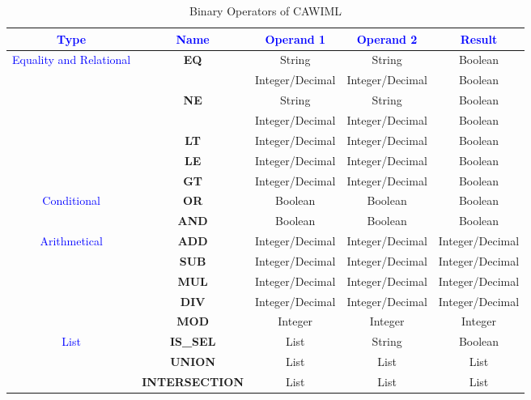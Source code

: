     \begin{sidewaystable}
    \begin{center}
    \begin{tabular}{|c|c|c|c|c|}
    \hline 
    \textcolor{blue}{Type} & \textcolor{blue}{Name} & \textcolor{blue}{Operand 1} & \textcolor{blue}{Operand 2} & \textcolor{blue}{Result}\tabularnewline
    \hline 
    \hline 
    \multirow{7}{*}{\textcolor{blue}{Equality and Relational}} & \multirow{2}{*}{\textbf{EQ}} & String & String & Boolean\tabularnewline
    \cline{3-5} 
     &  & Integer/Decimal & Integer/Decimal & Boolean\tabularnewline
    \cline{2-5} 
     & \multirow{2}{*}{\textbf{NE}} & String & String & Boolean\tabularnewline
    \cline{3-5} 
     &  & Integer/Decimal & Integer/Decimal & Boolean\tabularnewline
    \cline{2-5} 
     & \textbf{LT} & Integer/Decimal & Integer/Decimal & Boolean\tabularnewline
    \cline{2-5} 
     & \textbf{LE} & Integer/Decimal & Integer/Decimal & Boolean\tabularnewline
    \cline{2-5} 
     & \textbf{GT} & Integer/Decimal & Integer/Decimal & Boolean\tabularnewline
    \hline 
    \multirow{2}{*}{\textcolor{blue}{Conditional}} & \textbf{OR} & Boolean & Boolean & Boolean\tabularnewline
    \cline{2-5} 
     & \textbf{AND} & Boolean & Boolean & Boolean\tabularnewline
    \hline 
    \multirow{5}{*}{\textcolor{blue}{Arithmetical}} & \textbf{ADD} & Integer/Decimal & Integer/Decimal & Integer/Decimal\tabularnewline
    \cline{2-5} 
     & \textbf{SUB} & Integer/Decimal & Integer/Decimal & Integer/Decimal\tabularnewline
    \cline{2-5} 
     & \textbf{MUL} & Integer/Decimal & Integer/Decimal & Integer/Decimal\tabularnewline
    \cline{2-5} 
     & \textbf{DIV} & Integer/Decimal & Integer/Decimal & Integer/Decimal\tabularnewline
    \cline{2-5} 
     & \textbf{MOD} & Integer & Integer & Integer\tabularnewline
    \hline 
    \multirow{3}{*}{\textcolor{blue}{List}} & \textbf{IS\_SEL} & List & String & Boolean\tabularnewline
    \cline{2-5} 
     & \textbf{UNION} & List & List & List\tabularnewline
    \cline{2-5} 
     & \textbf{INTERSECTION} & List & List & List\tabularnewline
    \hline 
    \end{tabular}
    \caption{Binary Operators of CAWIML}
    \label{tab:design:rpnbinary}
    \end{center}
    \end{sidewaystable}
   